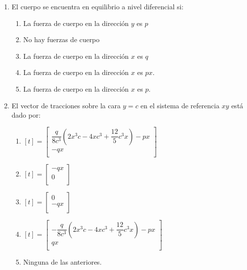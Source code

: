 \documentclass[../notas medios.tex]{subfiles}
\begin{document}
\begin{enumerate}
\begin{enumerate}
		\item El cuerpo se encuentra en equilibrio a nivel diferencial si:
		\begin{enumerate}
		\item La fuerza de cuerpo en la direcci\'on $y$ es $p$
		\item No hay fuerzas de cuerpo
		\item La fuerza de cuerpo en la direcci\'on $x$ es $q$
		\item La fuerza de cuerpo en la direcci\'on $x$ es $p x$.
		\item La fuerza de cuerpo en la direcci\'on $x$ es $p$.
		\end{enumerate}
		\item El vector de tracciones sobre la cara $y = c$ en el sistema de referencia $xy$ est\'a dado por: \\
		\begin{enumerate}
		\item 	%
		$[t] = \left[ \begin{array}{ccc}
		\dfrac{q}{8c^3} (2x^3c - 4xc^3 + \dfrac{12}{5}c^3x) - px \\ 
		-qx \\
		\end{array}  \right] $\\
		\item 	%
		$[t] = \left[ \begin{array}{ccc}
		-qx \\ 
		0 \\
		\end{array}  \right] $\\
		\item 	%
		$[t] = \left[ \begin{array}{ccc}
		0 \\ 
		-qx \\
		\end{array}  \right] $\\
		\item 	%
		$[t] = \left[ \begin{array}{ccc}
		- \dfrac{q}{8c^3} (2x^3c - 4xc^3 + \dfrac{12}{5}c^3x) - px \\ 
		qx \\
		\end{array}  \right] $\\	
		\item Ninguna de las anteriores.
		\end{enumerate}\	
		

\end{enumerate}
\end{enumerate}
\end{document}

